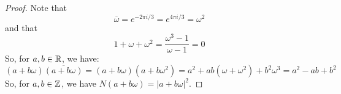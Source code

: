 \begin{proof}
    Note that
    \[ \overline{\omega} = e^{-2\pi i/3} = e^{4\pi i/3} = \omega^2 \]
    and that
    \[ 1+\omega+\omega^2 = \frac{\omega^3-1}{\omega-1} = 0 \]
    So, for $a,b \in \mathbb{R}$, we have:
    \[ (a+b\omega)\overline{(a+b\omega)} = (a+b\omega)(a+b\omega^2) = a^2 + ab(\omega+\omega^2) + b^2\omega^3 = a^2 - ab + b^2 \]
    So, for $a,b \in \mathbb{Z}$, we have $N(a+b\omega) = |a+b\omega|^2$.
\end{proof}